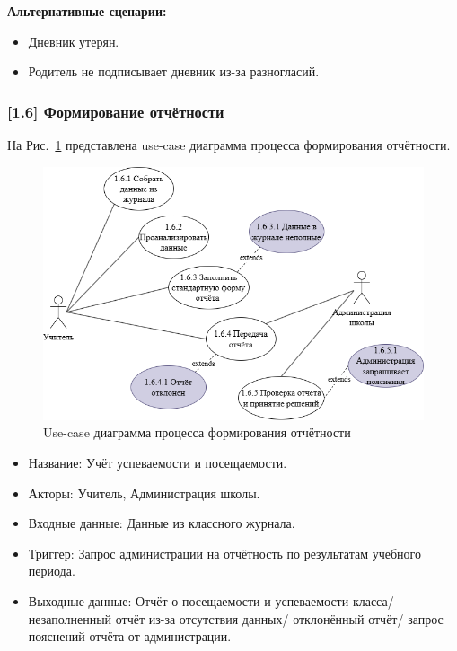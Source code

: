 \documentclass[a4paper, final]{article}
\begin{document}
\textbf{Альтернативные сценарии:}
\begin{itemize}
  \item[1.5.2.1] Дневник утерян.
  \item[1.5.3.1] Родитель не подписывает дневник из-за разногласий. 
\end{itemize}
  

\subsubsection{[1.6] Формирование отчётности}
На Рис.~\ref{img:use_case26} представлена use-case диаграмма процесса формирования отчётности.

\begin{figure}[H]
   \centering
   \includegraphics[width=\linewidth]{use_case26.png}
   \caption{Use-case диаграмма процесса формирования отчётности}
   \label{img:use_case26}
\end{figure}

\begin{itemize}
  \item Название: Учёт успеваемости и посещаемости.
  \item Акторы: Учитель, Администрация школы.
  \item Входные данные: Данные из классного журнала.
  \item Триггер: Запрос администрации на отчётность по результатам учебного периода.
  \item Выходные данные: Отчёт о посещаемости и успеваемости класса/ незаполненный отчёт из-за отсутствия данных/ отклонённый отчёт/ запрос пояснений отчёта от администрации.
\end{itemize}
\end{document}
